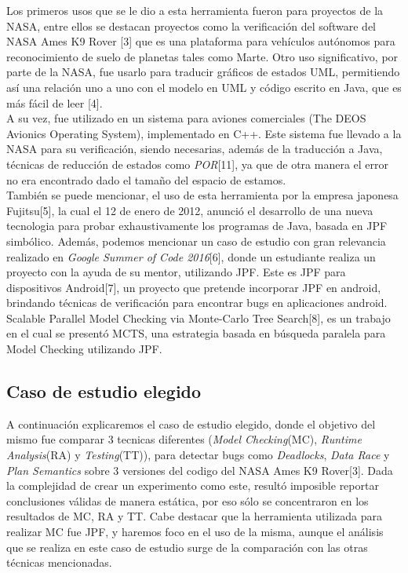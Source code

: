 \documentclass[runningheads]{llncs}
\begin{document}
Los primeros usos que se le dio a esta herramienta fueron para proyectos de la NASA, entre ellos se destacan proyectos como la verificaci\'on del software del NASA Ames K9 Rover [3] que es una plataforma para veh\'iculos aut\'onomos para reconocimiento de suelo de planetas tales como Marte.
Otro uso significativo, por parte de la NASA, fue usarlo para traducir gr\'aficos de estados UML, permitiendo as\'i una relaci\'on uno a uno con el modelo en UML y c\'odigo escrito en Java, que es m\'as f\'acil de leer [4].\\
A su vez, fue utilizado en un sistema para aviones comerciales (The DEOS Avionics Operating System), implementado en C++. Este sistema fue llevado a la NASA para su verificaci\'on, siendo necesarias, adem\'as de la traducci\'on a Java, t\'ecnicas de reducci\'on de estados como \textit{POR}[11], ya que de otra manera el error no era encontrado dado el tama\~no del espacio de estamos.\\
Tambi\'en se puede mencionar, el uso de esta herramienta por la empresa japonesa Fujitsu[5], la cual el 12 de enero de 2012, anunci\'o el desarrollo de una nueva tecnologia para probar exhaustivamente los programas de Java, basada en JPF simb\'olico.
Adem\'as, podemos mencionar un caso de estudio con gran relevancia realizado en \textit{Google Summer of Code 2016}[6], donde un estudiante realiza un proyecto con la ayuda de su mentor, utilizando JPF. Este es JPF para dispositivos Android[7], un proyecto que pretende incorporar JPF en android, brindando t\'ecnicas de verificaci\'on para encontrar bugs en aplicaciones android.\\
Scalable Parallel Model Checking via Monte-Carlo Tree Search[8], es un trabajo en el cual se present\'o MCTS, una estrategia basada en b\'usqueda paralela para Model Checking utilizando JPF.\\

\subsection{Caso de estudio elegido}
A continuaci\'on explicaremos el caso de estudio elegido, donde el objetivo del mismo fue comparar 3 tecnicas diferentes (\textit{Model Checking}(MC), \textit{Runtime Analysis}(RA) y \textit{Testing}(TT)), para detectar bugs como \textit{Deadlocks}, \textit{Data Race} y \textit{Plan Semantics} sobre 3 versiones del codigo del NASA Ames K9 Rover[3].
Dada la complejidad de crear un experimento como este, result\'o imposible reportar conclusiones v\'alidas de manera est\'atica, por eso s\'olo se concentraron en los resultados de MC, RA y TT. Cabe destacar que la herramienta utilizada para realizar MC fue JPF, y haremos foco en el uso de la misma, aunque el an\'alisis que se realiza en este caso de estudio surge de la comparaci\'on con las otras t\'ecnicas mencionadas.
\end{document}
